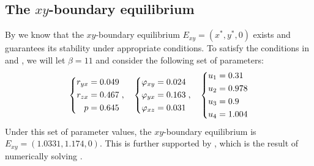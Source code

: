 \subsection{The $xy$-boundary equilibrium}\label{subsec:numsim_xy_boundary_equilibrium}
By  we know that the $xy$-boundary equilibrium $E_{xy}=\left(x^*,y^*,0\right)$ exists and  guarantees its stability under appropriate conditions.
To satisfy the conditions in  and , we will let $\beta=11$ and consider the following set of parameters:
\begin{equation}\label{params:boundary-xy}
    \begin{dcases}
        \begin{aligned}
            r_{yx} &= 0.049\\
            r_{zx} &= 0.467\\
            p &= 0.645
        \end{aligned}
    \end{dcases},\quad 
    \begin{dcases}
        \begin{aligned}
            \varphi_{xy} &= 0.024\\
            \varphi_{yx} &= 0.163\\
            \varphi_{xz} &= 0.031
        \end{aligned}
    \end{dcases},\quad
    \begin{dcases}
        \begin{aligned}
            u_1 &= 0.31\\
            u_2 &= 0.978\\
            u_3 &= 0.9\\
            u_4 &= 1.004
        \end{aligned}
    \end{dcases}
\end{equation}
Under this set of parameter values, the $xy$-boundary equilibrium is $E_{xy}=(1.0331,1.174,0)$.
This is further supported by , which is the result of numerically solving .

